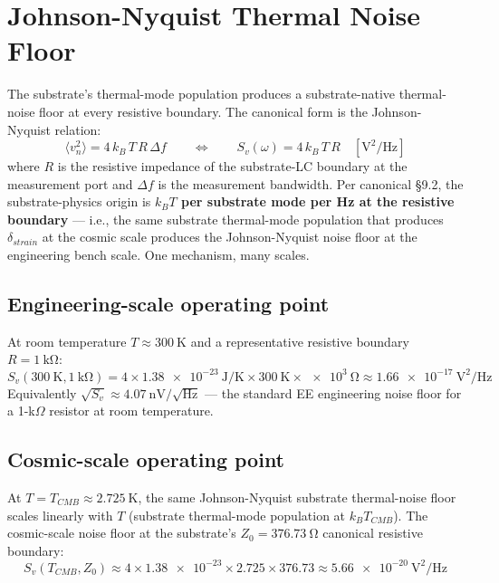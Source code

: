 \section{Johnson-Nyquist Thermal Noise Floor}
\label{sec:vol9_johnson_nyquist}

The substrate's thermal-mode population produces a substrate-native thermal-noise floor at every resistive boundary. The canonical form is the Johnson-Nyquist relation:
\begin{equation}
\langle v_n^2 \rangle = 4\,k_B\,T\,R\,\Delta f \qquad\Leftrightarrow\qquad S_v(\omega) = 4\,k_B\,T\,R \quad[\text{V}^2/\text{Hz}]
\end{equation}
where $R$ is the resistive impedance of the substrate-LC boundary at the measurement port and $\Delta f$ is the measurement bandwidth. Per canonical  \S 9.2, the substrate-physics origin is \textbf{$k_B T$ per substrate mode per Hz at the resistive boundary} --- i.e., the same substrate thermal-mode population that produces $\delta_{strain}$ at the cosmic scale produces the Johnson-Nyquist noise floor at the engineering bench scale. One mechanism, many scales.

\subsection{Engineering-scale operating point}

At room temperature $T \approx \qty{300}{\kelvin}$ and a representative resistive boundary $R = \qty{1}{\kilo\ohm}$:
\begin{equation}
S_v(\qty{300}{\kelvin}, \qty{1}{\kilo\ohm}) = 4 \times \qty{1.38e-23}{\joule\per\kelvin} \times \qty{300}{\kelvin} \times \qty{e3}{\ohm} \approx \qty{1.66e-17}{\volt\squared\per\hertz}
\end{equation}
Equivalently $\sqrt{S_v} \approx \num{4.07}~\text{nV}/\sqrt{\text{Hz}}$ --- the standard EE engineering noise floor for a 1-k$\Omega$ resistor at room temperature.

\subsection{Cosmic-scale operating point}

At $T = T_{CMB} \approx \qty{2.725}{\kelvin}$, the same Johnson-Nyquist substrate thermal-noise floor scales linearly with $T$ (substrate thermal-mode population at $k_B T_{CMB}$). The cosmic-scale noise floor at the substrate's $Z_0 = \qty{376.73}{\ohm}$ canonical resistive boundary:
\begin{equation}
S_v(T_{CMB}, Z_0) \approx 4 \times \num{1.38e-23} \times 2.725 \times 376.73 \approx \qty{5.66e-20}{\volt\squared\per\hertz}
\end{equation}

